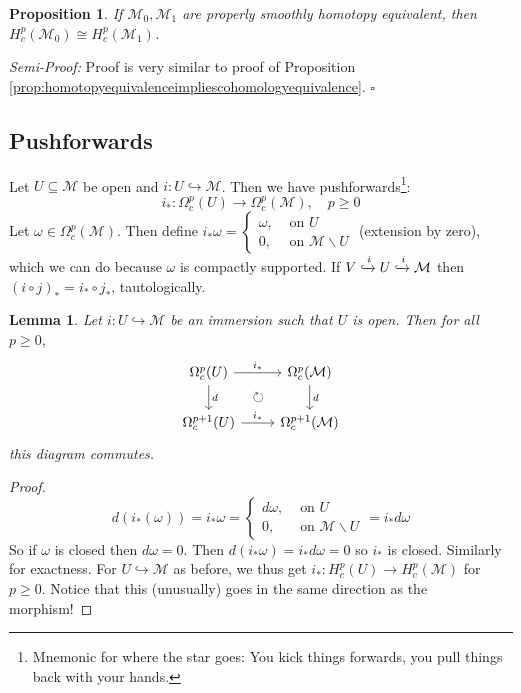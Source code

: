 \documentclass[10pt]{article}
\theoremstyle{plain}
\newtheorem{lemma}[thm]{Lemma}
\newtheorem{prop}[thm]{Proposition}
\theoremstyle{definition}
\newenvironment{semiproof}{\textit{Semi-Proof:}}{\hfill$\square$}
\newcommand{\man}{\mathcal{M}}
\newcommand{\compactpformman}[1]{\Omega^{#1}_c(\man)}
\newcommand{\deriv}{d}
\newcommand{\dw}{d\omega}
\newcommand{\mysubsection}[1]{
    \subsection{#1}
}
\begin{document}
\begin{prop}
If $\man_0,\man_1$ are properly smoothly homotopy equivalent, then $H^p_c(\man_0) \cong H^p_c(\man_1)$.
\end{prop}
\begin{semiproof}
Proof is very similar to proof of Proposition \ref{prop:homotopyequivalenceimpliescohomologyequivalence}.
\end{semiproof}
\mysubsection{Pushforwards}
Let $U\subseteq \man$ be open and $i : U\hookrightarrow \man$. Then we have pushforwards\footnote{Mnemonic for where the star goes: You kick things forwards, you pull things back with your hands.}:
$$i_* : \Omega_c^p(U) \to \compactpformman{p}, \quad p \geq 0$$
Let $\omega \in \compactpformman{p}$. Then define $i_* \omega = \begin{cases}\omega, & \text{ on } U\\ 0, & \text{ on } \man \backslash U \end{cases}$ (extension by zero), which we can do because $\omega$ is compactly supported. If $V \xhookrightarrow{i} U \xhookrightarrow{i} \man$ then $(i \circ j )_* = i_* \circ j_*$, tautologically.
\begin{lemma}
Let $i : U \hookrightarrow \man $ be an immersion such that $U$ is open. Then for all $p \geq 0,$
$$%
\begin{tikzcd}
\Omega _c ^p (U)  \arrow[r, "i_*"] \arrow[d, "d"]  \arrow[dr,phantom,"\circlearrowright"]& \Omega_c^p(\mathcal{M}) \arrow[d, "d"] \\
\Omega_c^{p+1}(U) \arrow[r, "i_*"]                & \Omega_c^{p+1}(\mathcal{M})           
\end{tikzcd}$$
this diagram commutes.
\end{lemma}
\begin{proof}
$$\deriv(i_*(\omega))= i_* \omega = \begin{cases}\deriv\omega, & \text{ on } U\\ 0, & \text{ on } \man \backslash U \end{cases} = i_* \dw$$
So if $\omega$ is closed then $\dw = 0.$ Then $d(i_*\omega) = i_* \dw = 0$ so $i_*$ is closed. Similarly for exactness. For $U \hookrightarrow \man $ as before, we thus get $i_* : H^p_c(U) \to H^p_c(\man)$ for $p \geq 0$. Notice that this (unusually) goes in the same direction as the morphism!
\end{proof}
\end{document}
